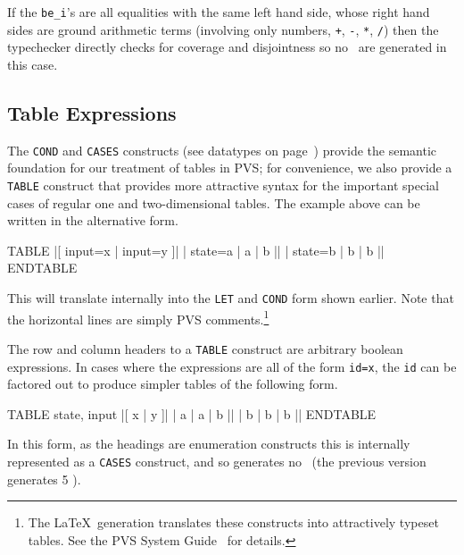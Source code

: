 If the \texttt{be\_i}'s are all equalities with the same left hand side,
whose right hand sides are ground arithmetic terms (involving only
numbers, \texttt{+}, \texttt{-}, \texttt{*}, \texttt{/}) then the typechecker
directly checks for coverage and disjointness so no \tccs\ are generated
in this case.



\subsection{Table Expressions}

The \texttt{COND} and \texttt{CASES} constructs (see datatypes on page~\pageref{datatypes}) provide the semantic
foundation for our treatment of tables in PVS; for convenience, we
also provide a \texttt{TABLE} construct that provides more attractive
syntax for the important special cases of regular one and
two-dimensional tables.  The example above can be written in the
alternative form.
\begin{pvsex}
   TABLE
               |[ input=x | input=y ]|
      | state=a |    a    |    b    ||
      | state=b |    b    |    b    ||
   ENDTABLE
\end{pvsex}
This will translate internally into the \texttt{LET} and \texttt{COND} form
shown earlier.  Note that the horizontal lines are simply PVS
comments.\footnote{The \LaTeX\ generation translates these constructs into attractively
typeset tables.  See the PVS System Guide~\cite{PVS:userguide} for details.}

The row and column headers to a \texttt{TABLE} construct are arbitrary
boolean expressions.   In cases where the expressions are all of the
form \texttt{id=x}, the \texttt{id} can be factored out to produce simpler
tables of the following form.
\begin{pvsex}
   TABLE state,    input
               |[ x | y ]|
         |  a   | a | b ||
         |  b   | b | b ||
   ENDTABLE
\end{pvsex}
In this form, as the headings are enumeration constructs this is
internally represented as a \texttt{CASES} construct, and so generates
no \tccs\ (the previous version generates 5 \tccs).

